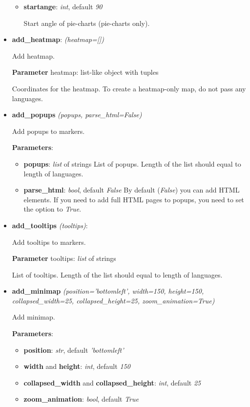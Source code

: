 \documentclass[a4paper,12pt]{article}
\begin{document}
\begin{itemize}
\begin{itemize}
 \item \textbf{startange}: \textit{int}, default \textit{90}
 
 Start angle of pie-charts (pie-charts only).
 
 \end{itemize}
 
 \item \textbf{add\_heatmap}: \textit{(heatmap=[])}
    
    Add heatmap.
    
    \textbf{Parameter} heatmap: list-like object with tuples
    
    Coordinates for the heatmap. To create a heatmap-only map, do not pass any languages.

 \item \textbf{add\_popups} \textit{(popups, parse\_html=False)}
    
    Add popups to markers.
    
    \textbf{Parameters}:
    \begin{itemize}
     \item \textbf{popups}: \textit{list} of strings
       List of popups. Length of the list should equal to length of languages.
     \item \textbf{parse\_html}: \textit{bool}, default \textit{False}
       By default (\textit{False}) you can add HTML elements.
       If you need to add full HTML pages to popups, you need to set the option to \textit{True}.
    \end{itemize}
    
 \item \textbf{add\_tooltips} \textit{(tooltips)}:
 
    Add tooltips to markers.
    
    \textbf{Parameter} tooltips: \textit{list} of strings
    
    List of tooltips. Length of the list should equal to length of languages.

 \item \textbf{add\_minimap} \textit{(position='bottomleft', width=150, height=150, collapsed\_width=25, collapsed\_height=25, zoom\_animation=True)}
 
 Add minimap.

 \textbf{Parameters}:
 \begin{itemize}
  \item \textbf{position}: \textit{str}, default \textit{'bottomleft'}
  \item \textbf{width} and \textbf{height}: \textit{int}, default \textit{150}
  \item \textbf{collapsed\_width} and \textbf{collapsed\_height}: \textit{int}, default \textit{25}
  \item \textbf{zoom\_animation}: \textit{bool}, default \textit{True}
  

\end{itemize}
\end{itemize}
\end{document}
